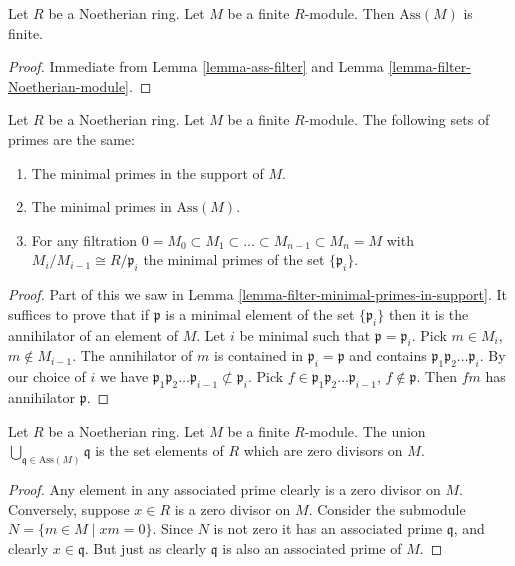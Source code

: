 \begin{lemma}
\label{lemma-finite-ass}
Let $R$ be a Noetherian ring.
Let $M$ be a finite $R$-module.
Then $\text{Ass}(M)$ is finite.
\end{lemma}

\begin{proof}
Immediate from Lemma \ref{lemma-ass-filter} and
Lemma \ref{lemma-filter-Noetherian-module}.
\end{proof}

\begin{proposition}
\label{proposition-minimal-primes-associated-primes}
Let $R$ be a Noetherian ring.
Let $M$ be a finite $R$-module.
The following sets of primes are the same:
\begin{enumerate}
\item The minimal primes in the support of $M$.
\item The minimal primes in $\text{Ass}(M)$.
\item For any filtration $0 = M_0 \subset M_1 \subset \ldots
\subset M_{n-1} \subset M_n = M$ with $M_i/M_{i-1} \cong R/\mathfrak p_i$
the minimal primes of the set $\{\mathfrak p_i\}$.
\end{enumerate}
\end{proposition}

\begin{proof}
Part of this we saw in Lemma \ref{lemma-filter-minimal-primes-in-support}.
It suffices to prove that if $\mathfrak p$ is a minimal element of
the set $\{\mathfrak p_i\}$ then it is the annihilator of
an element of $M$. Let $i$ be minimal such that
$\mathfrak p = \mathfrak p_i$.
Pick $m \in M_i$, $m \not \in M_{i-1}$. The annihilator of $m$
is contained in $\mathfrak p_i = \mathfrak p$ and contains
$\mathfrak p_1 \mathfrak p_2 \ldots \mathfrak p_i$. By our choice of
$i$ we have $\mathfrak p_1 \mathfrak p_2 \ldots \mathfrak p_{i-1}
\not \subset \mathfrak p_i$. Pick
$f \in \mathfrak p_1 \mathfrak p_2 \ldots \mathfrak p_{i-1}$,
$f \not \in \mathfrak p$. Then $fm$ has annihilator $\mathfrak p$.
\end{proof}

\begin{lemma}
\label{lemma-ass-zero-divisors}
Let $R$ be a Noetherian ring.
Let $M$ be a finite $R$-module.
The union $\bigcup_{\mathfrak q \in \text{Ass}(M)} \mathfrak q$
is the set elements of $R$ which are zero divisors on $M$.
\end{lemma}

\begin{proof}
Any element in any associated prime clearly is a zero divisor
on $M$. Conversely, suppose $x \in R$ is a zero divisor on $M$.
Consider the submodule $N = \{m \in M \mid xm = 0\}$.
Since $N$ is not zero it has an associated prime $\mathfrak q$,
and clearly $x \in \mathfrak q$. But just as clearly $\mathfrak q$
is also an associated prime of $M$.
\end{proof}












